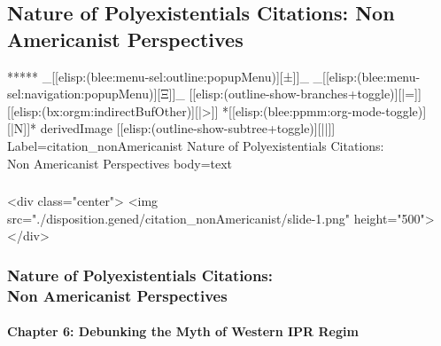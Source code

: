 \begin{whenOrg}
\section{Nature of Polyexistentials Citations: Non Americanist Perspectives}


\begin{whenOrg}
*****  _[[elisp:(blee:menu-sel:outline:popupMenu)][±]]_ _[[elisp:(blee:menu-sel:navigation:popupMenu)][Ξ]]_ [[elisp:(outline-show-branches+toggle)][|=]] [[elisp:(bx:orgm:indirectBufOther)][|>]] *[[elisp:(blee:ppmm:org-mode-toggle)][|N]]*  derivedImage [[elisp:(outline-show-subtree+toggle)][||]] Label=citation_nonAmericanist Nature of Polyexistentials Citations:\\ Non Americanist Perspectives body=text
\end{whenOrg}

\begin{htmlonly}

\begin{frame}[fragile,plain,label=citation_nonAmericanist]
    \frametitle{}
    \framesubtitle{}
    \begin{rawhtml}
<div class="center">
<img src="./disposition.gened/citation_nonAmericanist/slide-1.png" height="500">
</div>
    \end{rawhtml}
\end{frame}
\end{htmlonly}

\begin{verblatex}

\begin{frame}[fragile,plain,label=citation_nonAmericanist]
    \frametitle{Nature of Polyexistentials Citations:\\ Non Americanist Perspectives}
    \framesubtitle{}


    \begin{center}
      \begin{large}
        \textbf{Chapter 6: Debunking the Myth of Western IPR Regim}
      \end{large}
  \end{center}


\end{frame}
\end{verblatex}
\end{whenOrg}
